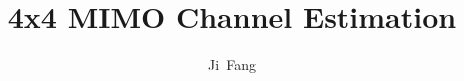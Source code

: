 \documentclass{book}
\begin{document}
\title{4x4 MIMO Channel Estimation}
\author{Ji~Fang}

\maketitle



\end{document}
